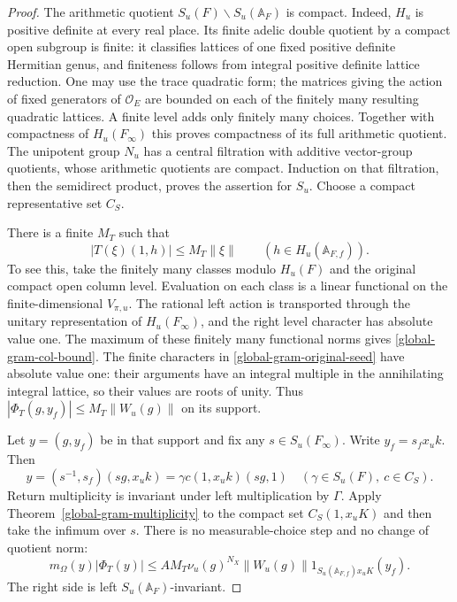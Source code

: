 \begin{proof}
The arithmetic quotient $S_u(F)\backslash S_u(\mathbb A_F)$ is
compact.  Indeed, $H_u$ is positive definite at every real place.
Its finite adelic double quotient by a compact open subgroup is
finite: it classifies lattices of one fixed positive definite
Hermitian genus, and finiteness follows from integral positive
definite lattice reduction.  One may use the trace quadratic form;
the matrices giving the action of fixed generators of
$\mathcal O_E$ are bounded on each of the finitely many resulting
quadratic lattices.  A finite level adds only finitely many choices.
Together with compactness of $H_u(F_\infty)$ this proves compactness
of its full arithmetic quotient.  The unipotent group $N_u$ has a
central filtration with additive vector-group quotients, whose
arithmetic quotients are compact.  Induction on that filtration,
then the semidirect product, proves the assertion for $S_u$.
Choose a compact representative set $C_S$.

There is a finite $M_T$ such that
\begin{equation}\label{global-gram-col-bound}
                 |T(\xi)(1,h)|\le M_T\|\xi\|
                 \qquad(h\in H_u(\mathbb A_{F,f})).
\end{equation}
To see this, take the finitely many classes modulo $H_u(F)$ and
the original compact open column level.  Evaluation on each class
is a linear functional on the finite-dimensional $V_{\pi,u}$.
The rational left action is transported through the unitary
representation of $H_u(F_\infty)$, and the right level character
has absolute value one.  The maximum of these finitely many
functional norms gives \eqref{global-gram-col-bound}.
The finite characters in \eqref{global-gram-original-seed} have
absolute value one: their arguments have an integral multiple in
the annihilating integral lattice, so their values are roots of
unity.  Thus $|\Phi_T(g,y_f)|\le M_T\|W_u(g)\|$ on its support.

Let $y=(g,y_f)$ be in that support and fix any $s\in S_u(F_\infty)$.
Write $y_f=s_fx_uk$.  Then
\[
 y=(s^{-1},s_f)(sg,x_uk)
   =\gamma c(1,x_uk)(sg,1)
 \quad(\gamma\in S_u(F),\ c\in C_S).
\]
Return multiplicity is invariant under left multiplication by
$\Gamma$.  Apply Theorem~\ref{global-gram-multiplicity} to the
compact set $C_S(1,x_uK)$ and then take the infimum over $s$.
There is no measurable-choice step and no change of quotient norm:
\begin{equation}\label{global-gram-weight-majorant}
 m_\Omega(y)|\Phi_T(y)|
 \le A M_T\nu_u(g)^{N_X}\|W_u(g)\|
       1_{S_u(\mathbb A_{F,f})x_uK}(y_f).
\end{equation}
The right side is left $S_u(\mathbb A_F)$-invariant.


\end{proof}
